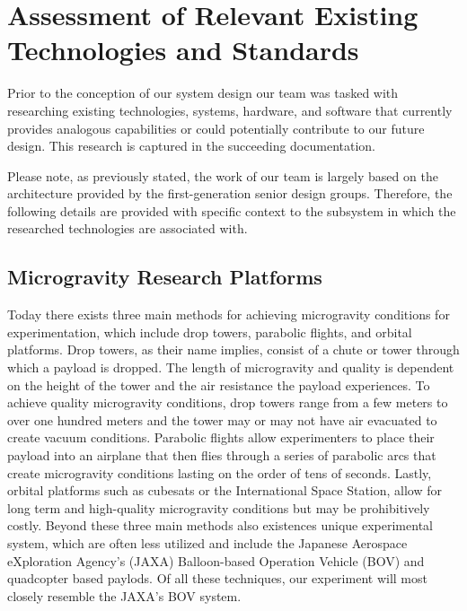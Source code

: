 \section{Assessment of Relevant Existing Technologies and Standards}

\indent\indent Prior to the conception of our system design our team was tasked with researching existing technologies, systems, hardware, and software that currently provides analogous capabilities or could potentially contribute to our future design. This research is captured in the succeeding documentation. 

Please note, as previously stated, the work of our team is largely based on the architecture provided by the first-generation senior design groups. Therefore, the following details are provided with specific context to the subsystem in which the researched technologies are associated with. 

\subsection{Microgravity Research Platforms}

\indent\indent Today there exists three main methods for achieving microgravity conditions for experimentation, which include drop towers, parabolic flights, and orbital platforms. Drop towers, as their name implies, consist of a chute or tower through which a payload is dropped. The length of microgravity and quality is dependent on the height of the tower and the air resistance the payload experiences. To achieve quality microgravity conditions, drop towers range from a few meters to over one hundred meters and the tower may or may not have air evacuated to create vacuum conditions. Parabolic flights allow experimenters to place their payload into an airplane that then flies through a series of parabolic arcs that create microgravity conditions lasting on the order of tens of seconds. Lastly, orbital platforms such as cubesats or the International Space Station, allow for long term and high-quality microgravity conditions but may be prohibitively costly. Beyond these three main methods also existences unique experimental system, which are often less utilized and include the Japanese Aerospace eXploration Agency's (JAXA) Balloon-based Operation Vehicle (BOV) and quadcopter based paylods. Of all these techniques, our experiment will most closely resemble the JAXA's BOV system.


